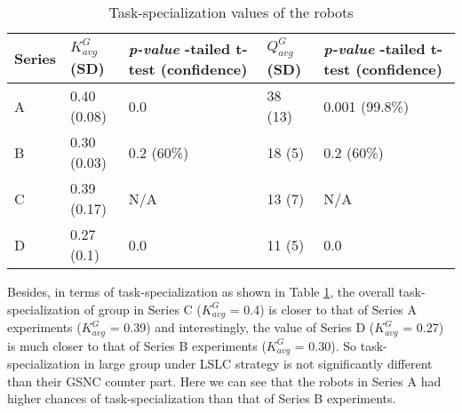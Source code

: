 \documentclass[journal]{IEEEtran}
\begin{document}
\begin{table}
\begin{small}
\begin{center}
\caption{Task-specialization values of the robots}
\begin{tabular}{|p{0.22in}|p{0.3in}|p{0.55in}|p{0.32in}|p{0.55in}|}
\hline  Series & $ K^G_{avg}$ \protect\newline (SD) & \textit{ p-value} \protect\newline 1-tailed \protect\newline t-test \protect\newline (confidence)  & $ Q^G_{avg}$ \protect\newline (SD) & \textit{ p-value} \protect\newline 1-tailed \protect\newline t-test \protect\newline (confidence) \\ 
\hline A & 0.40 (0.08)& 0.0 & 38 (13) & 0.001 (99.8\%)\\ 
\hline B &  0.30 (0.03) & 0.2 (60\%) &  18 (5) & 0.2 (60\%)\\
\hline C  & 0.39 (0.17) & N/A & 13 (7) & N/A \\
\hline D  & 0.27 (0.1)& 0.0 & 11 (5) & 0.0\\
\hline
\end{tabular}
\label{table:k-cmp} 
\end{center}
\end{small}
\vspace*{-0.8cm}
\end{table}
Besides, in terms of task-specialization as shown in Table \ref{table:k-cmp}, the overall task-specialization of group in Series C ($K^G_{avg}$ = 0.4) is  closer to that of Series A experiments ($K^G_{avg}$ = 0.39) and interestingly, the value of  Series D ($K^G_{avg}$ = 0.27) is  much closer to that of Series B experiments ($K^G_{avg}$ = 0.30). So task-specialization in large group under LSLC strategy is not significantly different than their GSNC counter part.
Here we can see that the robots in Series A had higher chances of task-specialization than that of Series B experiments.
%
\end{document}
